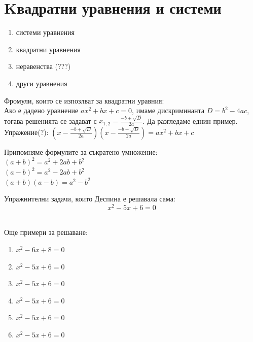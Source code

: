 \documentclass{article}
\begin{document}
	
	\section{Kвадратни уравнения и системи}
	
		
	\begin{enumerate}
		\item системи уравнения
		\item квадратни уравнения
		\item неравенства (???)
		\item други уравнения
	\end{enumerate}
	
	
	
	Фромули, които се изпозлват за квадратни уравния: \\
	Ако е дадено уравнение $ax^2 + bx + c = 0  $, имаме дискриминанта  $ D= b^2 - 4ac $, тогава решенията се задават с $ x_{1,2} = \frac{-b \pm \sqrt{D}  }{2a}$. Да разгледаме еднин пример. 
	Упражение(?): $(x - \frac{-b + \sqrt{D}  }{2a}  )(x - \frac{-b - \sqrt{D}  }{2a}) = ax^2 + bx +c $

	
	Припомняме формулите за съкратено умножение:\\
	 $(a+b)^2 = a^2 + 2ab + b^2$ \\
	 $(a-b)^2 = a^2 - 2ab + b^2$ \\
	 $(a+b)(a-b) = a^2 - b^2 $
	 
	 \vspace{1cm}
	 
	 
	
	Упражнителни задачи, които Деспина е решавала сама: \\
	
		$$x^2 - 5x + 6 = 0$$  \\
		
		
		\vspace{3cm}
		
		Още примери за решаване: \\
		\begin{enumerate}
			\item $x^2 - 6x + 8 = 0$
			\item $x^2 - 5x + 6 = 0$
			\item $x^2 - 5x + 6 = 0$
			\item $x^2 - 5x + 6 = 0$
			\item $x^2 - 5x + 6 = 0$
			\item $x^2 - 5x + 6 = 0$
		\end{enumerate}

		
		
\end{document}
